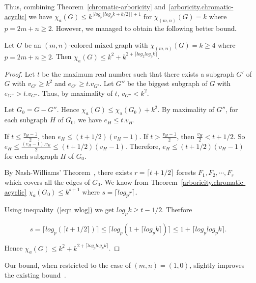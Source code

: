 \documentclass[11pt]{article}
\begin{document}
Thus, combining   Theorem~\ref{chromatic-arboricity} and~\ref{arboricity.chromatic-acyclic} we have 
$\chi_a(G) \leq k^{\lceil log_p \lceil log_{p}k +k/2 \rceil \rceil +1}$ for $\chi_{(m,n)}(G) = k$ where $p = 2m+n \geq 2$. 
However,  we managed to obtain the following better bound.


\begin{theorem}\label{chromatic-acyclic}
Let $G$ be an $(m,n)$-colored mixed graph with  $\chi_{(m,n)}(G) = k \geq 4$ where $p = 2m+n \geq 2$.  Then 
$\chi_a(G) \leq k^2 +k^{2+ \lceil log_2log_pk \rceil}$.
\end{theorem}



\begin{proof}
Let $t$ be the maximum real number such that there exists a subgraph $G'$ of $G$ with $v_{G'} \geq k^2$ and $e_{G'} \geq t.v_{G'}$.
Let $G''$ be the biggest subgraph of $G$ with $e_{G''} > t.v_{G''}$. Thus, by maximality of $t$, $v_{G''} < k^2$.

Let $G_0 = G - G''$. Hence $\chi_a(G) \leq \chi_a(G_0) + k^2$.
By maximality of $G''$, for each subgraph $H$ of $G_0$, we have $e_{H} \leq t.v_{H}$.


If $t \leq \frac{v_{H} - 1}{2}$, then $e_{H} \leq (t + 1/2)(v_{H} -1)$. If $t > \frac{v_{H} - 1}{2}$, then $\frac{v_{H}}{2} < t + 1/2$. So $e_{H} \leq \frac{(v_{H} -1).v_{H}}{2} \leq (t + 1/2)(v_{H} -1)$. Therefore, $e_{H} \leq (t + 1/2)(v_{H} -1)$ for each subgraph $H$ of $G_0$.

By Nash-Williams' Theorem~\cite{nash1page}, there exists $r = \lceil t + 1/2 \rceil$ forests $F_1, F_2, \cdots, F_r$ which covers all the edges of $G_0$. We know from Theorem~\ref{arboricity.chromatic-acyclic} $\chi_a(G_0) \leq k^{s +1}$ where $s = \lceil log_pr \rceil$. 


Using  inequality~(\ref{eqn wlog}) we get $log_p k \geq t - 1/2$. Therfore


$$s = \lceil log_p(\lceil t + 1/2 \rceil)\rceil \leq \lceil log_p(1 + \lceil log_pk \rceil)\rceil \leq 1 + \lceil log_plog_pk \rceil.$$

Hence $\chi_a(G) \leq k^2 +k^{2+ \lceil log_plog_pk \rceil}$.
\end{proof}



Our bound, when restricted to the case of $(m,n) = (1,0)$, slightly improves the existing bound~\cite{Kostochka97acyclicand}.
\end{document}
